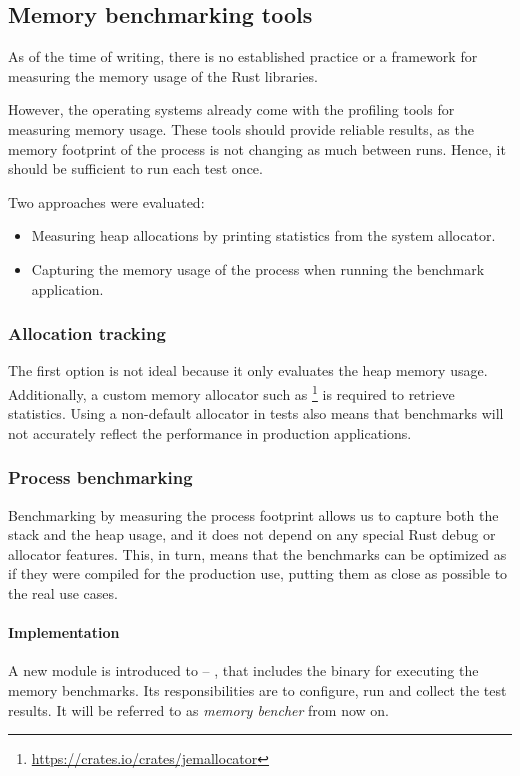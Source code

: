 \subsection{Memory benchmarking tools}
As of the time of writing, there is no established practice or a framework for measuring the memory usage of the Rust libraries.

However, the operating systems already come with the profiling tools for measuring memory usage. These tools should provide reliable results, as the memory footprint of the process is not changing as much between runs. Hence, it should be sufficient to run each test once.

Two approaches were evaluated:
\begin{itemize}
    \item Measuring heap allocations by printing statistics from the system allocator.
    \item Capturing the memory usage of the process when running the benchmark application.
\end{itemize}

\subsubsection*{Allocation tracking}
The first option is not ideal because it only evaluates the heap memory usage. Additionally, a custom memory allocator such as \footnote{\url{https://crates.io/crates/jemallocator}} is required to retrieve statistics. Using a non-default allocator in tests also means that benchmarks will not accurately reflect the performance in production applications.

\subsubsection*{Process benchmarking}
Benchmarking by measuring the process footprint allows us to capture both the stack and the heap usage, and it does not depend on any special Rust debug or allocator features. This, in turn, means that the benchmarks can be optimized as if they were compiled for the production use, putting them as close as possible to the real use cases.

\paragraph{Implementation}
A new module is introduced to \pvecrs{} -- , that includes the binary for executing the memory benchmarks. Its responsibilities are to configure, run and collect the test results. It will be referred to as \emph{memory bencher} from now on. 

